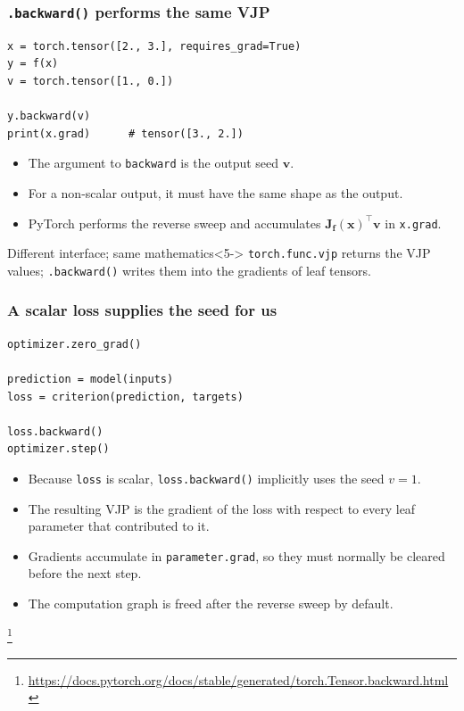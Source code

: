 \documentclass[]{article}
\newcommand\blfootnote[1]{%
  \begingroup
  \renewcommand\thefootnote{}\footnote{#1}%
  \addtocounter{footnote}{-1}%
  \endgroup
}
\begin{document}
\begin{frame}[fragile]
\frametitle{\texttt{.backward()} performs the same VJP}

\begin{lstlisting}
x = torch.tensor([2., 3.], requires_grad=True)
y = f(x)
v = torch.tensor([1., 0.])

y.backward(v)
print(x.grad)      # tensor([3., 2.])
\end{lstlisting}

\begin{itemize}
	\item<2-> The argument to \texttt{backward} is the output seed $\bm{v}$.
	\item<3-> For a non-scalar output, it must have the same shape as the output.
	\item<4-> PyTorch performs the reverse sweep and accumulates $\bm{J}_{\bm{f}}(\bm{x})^\top\bm{v}$ in \texttt{x.grad}.
\end{itemize}

\begin{block}{Different interface; same mathematics}<5->
	\texttt{torch.func.vjp} returns the VJP values; \texttt{.backward()} writes them into the gradients of leaf tensors.
\end{block}
\end{frame}


\begin{frame}[fragile]
\frametitle{A scalar loss supplies the seed for us}

\begin{lstlisting}
optimizer.zero_grad()

prediction = model(inputs)
loss = criterion(prediction, targets)

loss.backward()
optimizer.step()
\end{lstlisting}

\begin{itemize}
	\item<2-> Because \texttt{loss} is scalar, \texttt{loss.backward()} implicitly uses the seed $v=1$.
	\item<3-> The resulting VJP is the gradient of the loss with respect to every leaf parameter that contributed to it.
	\item<4-> Gradients accumulate in \texttt{parameter.grad}, so they must normally be cleared before the next step.
	\item<5-> The computation graph is freed after the reverse sweep by default.
\end{itemize}
\blfootnote{\url{https://docs.pytorch.org/docs/stable/generated/torch.Tensor.backward.html}}
\end{frame}
\end{document}
